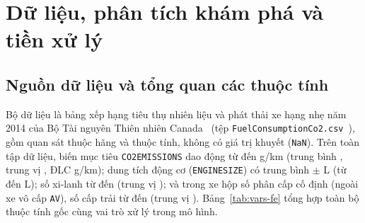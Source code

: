 \section{Dữ liệu, phân tích khám phá và tiền xử lý}
\label{sec:data}

\subsection{Nguồn dữ liệu và tổng quan các thuộc tính}
Bộ dữ liệu là bảng xếp hạng tiêu thụ nhiên liệu và phát thải \COtwo{} xe hạng nhẹ năm 2014 của Bộ Tài nguyên Thiên nhiên Canada~\cite{nrcan2014fuel} (tệp \texttt{FuelConsumptionCo2.csv}~\cite{ibm2014fuelco2}), gồm \nCars{} quan sát thuộc \nMakes{} hãng và \nCols{} thuộc tính, không có giá trị khuyết (\texttt{NaN}). Trên toàn tập dữ liệu, biến mục tiêu \texttt{CO2EMISSIONS} dao động từ \coMin{} đến \coMax{} g/km (trung bình \coMean{}, trung vị \coMedian{}, ĐLC \coSd{} g/km); dung tích động cơ (\texttt{ENGINESIZE}) có trung bình \engMean{} $\pm$ \engSd{} L (từ \engMin{} đến \engMax{} L); số xi-lanh từ \cylMin{} đến \cylMax{} (trung vị \cylMedian{}); và trong \nGeared{} xe hộp số phân cấp cố định (ngoài \nNoGear{} xe vô cấp \texttt{AV}), số cấp trải từ \gearsMin{} đến \gearsMax{} (trung vị \gearsMedian{}). Bảng~\ref{tab:vars-fe} tổng hợp toàn bộ thuộc tính gốc cùng vai trò xử lý trong mô hình.

